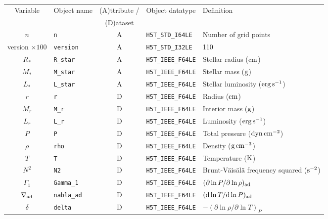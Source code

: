 \documentclass{article}
\newcommand{\diff}{\ensuremath{{\rm d}}}
\newcommand{\Rstar}{\ensuremath{R_{\ast}}}
\newcommand{\Mstar}{\ensuremath{M_{\ast}}}
\newcommand{\Lstar}{\ensuremath{L_{\ast}}}
\newcommand{\cm}{\ensuremath{{\rm cm}}}
\newcommand{\gram}{\ensuremath{{\rm g}}}
\newcommand{\second}{\ensuremath{{\rm s}}}
\newcommand{\dyne}{\ensuremath{{\rm dyn}}}
\newcommand{\erg}{\ensuremath{{\rm erg}}}
\newcommand{\kelvin}{\ensuremath{{\rm K}}}
\begin{document}
\begin{table}[h!]
\begin{tabular}{|c|l|c|l|l|} \hline
Variable & Object name & (A)ttribute / & Object datatype & Definition \\
&             & (D)ataset     &                 &            \\ \hline
$n$               & \texttt{n}            & A &\texttt{H5T\_STD\_I64LE}  & Number of grid points \\ 
version $\times 100$ & \texttt{version}   & A & \texttt{H5T\_STD\_I32LE}  & 110 \\
\Rstar            & \texttt{R\_star}      & A & \texttt{H5T\_IEEE\_F64LE} & Stellar radius ($\cm$) \\
\Mstar            & \texttt{M\_star}      & A & \texttt{H5T\_IEEE\_F64LE} & Stellar mass ($\gram$) \\
\Lstar            & \texttt{L\_star}      & A & \texttt{H5T\_IEEE\_F64LE} & Stellar luminosity ($\erg\,\second^{-1}$) \\
$r$               & \texttt{r}            & D & \texttt{H5T\_IEEE\_F64LE} & Radius ($\cm$) \\
$M_{r}$           & \texttt{M\_r}            & D & \texttt{H5T\_IEEE\_F64LE} & Interior mass ($\gram$) \\
$L_{r}$           & \texttt{L\_r}         & D & \texttt{H5T\_IEEE\_F64LE} & Luminosity ($\erg\,\second^{-1}$) \\
$P$               & \texttt{P}            & D & \texttt{H5T\_IEEE\_F64LE} & Total pressure ($\dyne\,\cm^{-2}$) \\
$\rho$            & \texttt{rho}          & D & \texttt{H5T\_IEEE\_F64LE} & Density ($\gram\,\cm^{-3}$) \\
$T$               & \texttt{T}            & D & \texttt{H5T\_IEEE\_F64LE} & Temperature ($\kelvin$) \\
$N^{2}$           & \texttt{N2}           & D & \texttt{H5T\_IEEE\_F64LE} & Brunt-V\"ais\"al\"a frequency squared ($\second^{-2}$) \\
$\Gamma_{1}$      & \texttt{Gamma\_1}      & D & \texttt{H5T\_IEEE\_F64LE} & $(\partial \ln P/\partial \ln \rho)_{\rm ad}$ \\
$\nabla_{\rm ad}$  & \texttt{nabla\_ad}      & D & \texttt{H5T\_IEEE\_F64LE} & $(\diff \ln T/\diff \ln P)_{\rm ad}$ \\
$\delta$          & \texttt{delta}            & D & \texttt{H5T\_IEEE\_F64LE} & $-(\partial \ln \rho/\partial \ln T)_{P}$  \\

\end{tabular}
\end{table}
\end{document}
